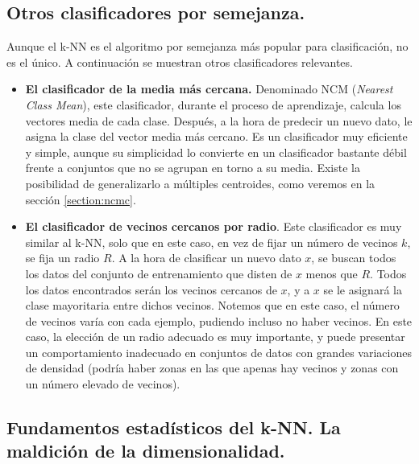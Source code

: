\subsection{Otros clasificadores por semejanza.}

Aunque el k-NN es el algoritmo por semejanza más popular para clasificación, no es el único. A continuación se muestran otros clasificadores relevantes.

\begin{itemize}
    \item \textbf{El clasificador de la media más cercana.} Denominado NCM (\emph{Nearest Class Mean}), este clasificador, durante el proceso de aprendizaje, calcula los vectores media de cada clase. Después, a la hora de predecir un nuevo dato, le asigna la clase del vector media más cercano. Es un clasificador muy eficiente y simple, aunque su simplicidad lo convierte en un clasificador bastante débil frente a conjuntos que no se agrupan en torno a su media. Existe la posibilidad de generalizarlo a múltiples centroides, como veremos en la sección \ref{section:ncmc}.

    \item \textbf{El clasificador de vecinos cercanos por radio}. Este clasificador es muy similar al k-NN, solo que en este caso, en vez de fijar un número de vecinos $k$, se fija un radio $R$. A la hora de clasificar un nuevo dato $x$, se buscan todos los datos del conjunto de entrenamiento que disten de $x$ menos que $R$. Todos los datos encontrados serán los vecinos cercanos de $x$, y a $x$ se le asignará la clase mayoritaria entre dichos vecinos. Notemos que en este caso, el número de vecinos varía con cada ejemplo, pudiendo incluso no haber vecinos. En este caso, la elección de un radio adecuado es muy importante, y puede presentar un comportamiento inadecuado en conjuntos de datos con grandes variaciones de densidad (podría haber zonas en las que apenas hay vecinos y zonas con un número elevado de vecinos).


\end{itemize}

\subsection{Fundamentos estadísticos del k-NN. La maldición de la dimensionalidad.}
